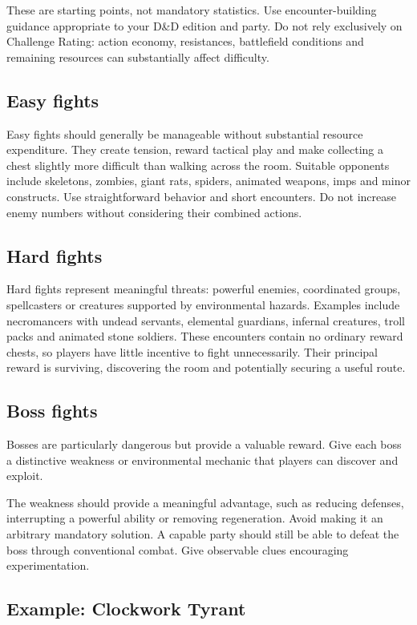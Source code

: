 These are starting points, not mandatory statistics. Use encounter-building guidance appropriate to your D\&D edition and party. Do not rely exclusively on Challenge Rating: action economy, resistances, battlefield conditions and remaining resources can substantially affect difficulty.

\subsection{Easy fights}

Easy fights should generally be manageable without substantial resource expenditure. They create tension, reward tactical play and make collecting a chest slightly more difficult than walking across the room. Suitable opponents include skeletons, zombies, giant rats, spiders, animated weapons, imps and minor constructs. Use straightforward behavior and short encounters. Do not increase enemy numbers without considering their combined actions.

\subsection{Hard fights}

Hard fights represent meaningful threats: powerful enemies, coordinated groups, spellcasters or creatures supported by environmental hazards. Examples include necromancers with undead servants, elemental guardians, infernal creatures, troll packs and animated stone soldiers. These encounters contain no ordinary reward chests, so players have little incentive to fight unnecessarily. Their principal reward is surviving, discovering the room and potentially securing a useful route.

\subsection{Boss fights}

Bosses are particularly dangerous but provide a valuable reward. Give each boss a distinctive weakness or environmental mechanic that players can discover and exploit.

The weakness should provide a meaningful advantage, such as reducing defenses, interrupting a powerful ability or removing regeneration. Avoid making it an arbitrary mandatory solution. A capable party should still be able to defeat the boss through conventional combat. Give observable clues encouraging experimentation.

\subsection{Example: Clockwork Tyrant}

